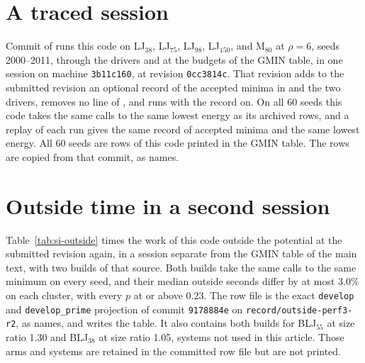 \documentclass[journal=jctcce,manuscript=suppinfo]{achemso}
\begin{document}
\section{A traced session}
\label{sec:si-g3}
Commit \texttt{} of
 runs this code on LJ\(_{38}\), LJ\(_{75}\),
LJ\(_{98}\), LJ\(_{150}\), and M\(_{80}\) at \(\rho=6\), seeds
2000--2011, through the drivers and at the budgets of the GMIN table, in one
session on machine \texttt{3b11c160}, at revision \texttt{0cc3814c}.
That revision adds to the submitted revision an optional record of the
accepted minima in  and the two drivers,
removes no line of , and runs with the record on.
On all 60 seeds this code takes the same calls to the same lowest energy as
its archived rows, and a replay of each run gives the same record of accepted
minima and the same lowest energy.
All 60 seeds are rows of this code printed in the GMIN table.
The rows are copied from that commit, as
 names.

\section{Outside time in a second session}
\label{sec:si-outside}
Table~\ref{tab:si-outside} times the work of this code outside the potential
at the submitted revision again, in a session separate from the GMIN table of
the main text, with two builds of that source.
Both builds take the same calls to the same minimum on every seed, and their
median outside seconds differ by at most 3.0\% on each cluster, with every
\(p\) at or above 0.23.
The row file is the exact \texttt{develop} and \texttt{develop\_prime}
projection of commit \texttt{9178884e} on
\texttt{record/outside-perf3-r2}, as
 names, and
 writes the table.
It also contains both builds for BLJ\(_{55}\) at size ratio 1.30 and
BLJ\(_{38}\) at size ratio 1.05, systems not used in this article.
Those arms and systems are retained in the committed row file but are not
printed.
\end{document}
